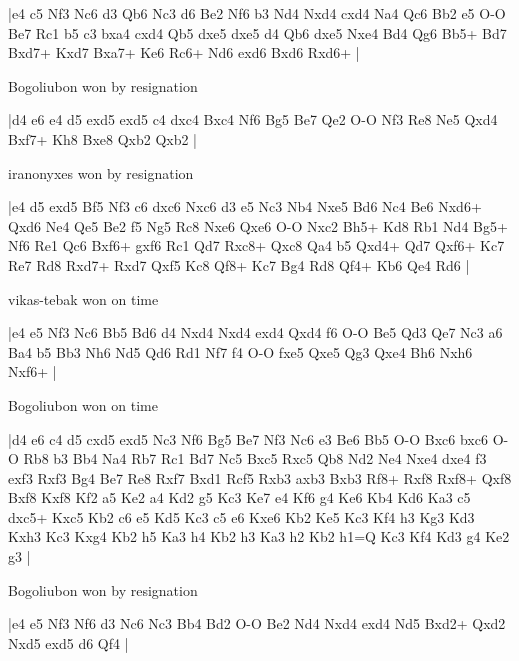 \makegametitle
|e4 c5 Nf3 Nc6 d3 Qb6 Nc3 d6 Be2 Nf6 b3 Nd4 Nxd4 cxd4 Na4 Qc6 Bb2 e5 O-O Be7 Rc1 b5 c3 bxa4 cxd4 Qb5 dxe5 dxe5 d4 Qb6 dxe5 Nxe4 Bd4 Qg6 Bb5+ Bd7 Bxd7+ Kxd7 Bxa7+ Ke6 Rc6+ Nd6 exd6 Bxd6 Rxd6+  |

\showboard

Bogoliubon won by resignation

\makegametitle
|d4 e6 e4 d5 exd5 exd5 c4 dxc4 Bxc4 Nf6 Bg5 Be7 Qe2 O-O Nf3 Re8 Ne5 Qxd4 Bxf7+ Kh8 Bxe8 Qxb2 Qxb2  |

\showboard

iranonyxes won by resignation

\makegametitle
|e4 d5 exd5 Bf5 Nf3 c6 dxc6 Nxc6 d3 e5 Nc3 Nb4 Nxe5 Bd6 Nc4 Be6 Nxd6+ Qxd6 Ne4 Qe5 Be2 f5 Ng5 Rc8 Nxe6 Qxe6 O-O Nxc2 Bh5+ Kd8 Rb1 Nd4 Bg5+ Nf6 Re1 Qc6 Bxf6+ gxf6 Rc1 Qd7 Rxc8+ Qxc8 Qa4 b5 Qxd4+ Qd7 Qxf6+ Kc7 Re7 Rd8 Rxd7+ Rxd7 Qxf5 Kc8 Qf8+ Kc7 Bg4 Rd8 Qf4+ Kb6 Qe4 Rd6  |

\showboard

vikas-tebak won on time

\makegametitle
|e4 e5 Nf3 Nc6 Bb5 Bd6 d4 Nxd4 Nxd4 exd4 Qxd4 f6 O-O Be5 Qd3 Qe7 Nc3 a6 Ba4 b5 Bb3 Nh6 Nd5 Qd6 Rd1 Nf7 f4 O-O fxe5 Qxe5 Qg3 Qxe4 Bh6 Nxh6 Nxf6+  |

\showboard

Bogoliubon won on time

\makegametitle
|d4 e6 c4 d5 cxd5 exd5 Nc3 Nf6 Bg5 Be7 Nf3 Nc6 e3 Be6 Bb5 O-O Bxc6 bxc6 O-O Rb8 b3 Bb4 Na4 Rb7 Rc1 Bd7 Nc5 Bxc5 Rxc5 Qb8 Nd2 Ne4 Nxe4 dxe4 f3 exf3 Rxf3 Bg4 Be7 Re8 Rxf7 Bxd1 Rcf5 Rxb3 axb3 Bxb3 Rf8+ Rxf8 Rxf8+ Qxf8 Bxf8 Kxf8 Kf2 a5 Ke2 a4 Kd2 g5 Kc3 Ke7 e4 Kf6 g4 Ke6 Kb4 Kd6 Ka3 c5 dxc5+ Kxc5 Kb2 c6 e5 Kd5 Kc3 c5 e6 Kxe6 Kb2 Ke5 Kc3 Kf4 h3 Kg3 Kd3 Kxh3 Kc3 Kxg4 Kb2 h5 Ka3 h4 Kb2 h3 Ka3 h2 Kb2 h1=Q Kc3 Kf4 Kd3 g4 Ke2 g3  |

\showboard

Bogoliubon won by resignation

\makegametitle
|e4 e5 Nf3 Nf6 d3 Nc6 Nc3 Bb4 Bd2 O-O Be2 Nd4 Nxd4 exd4 Nd5 Bxd2+ Qxd2 Nxd5 exd5 d6 Qf4  |

